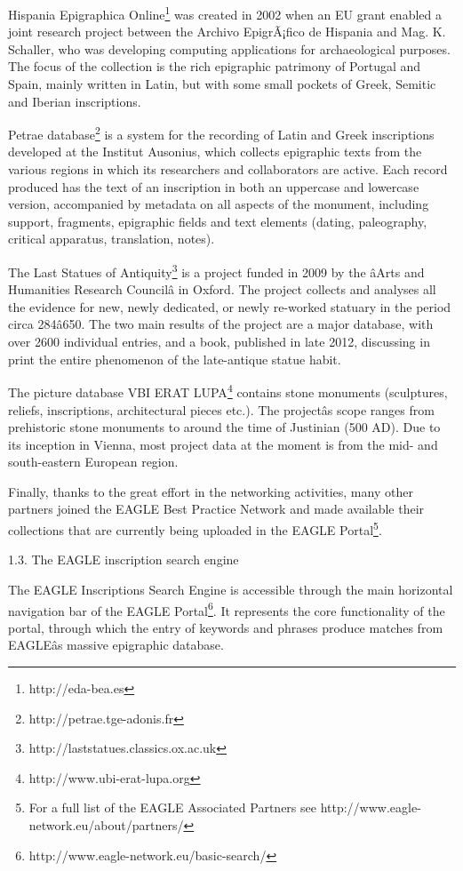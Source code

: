 Hispania Epigraphica Online\footnote{ http://eda-bea.es} was created in 2002 when an EU grant enabled a joint research
project between the Archivo EpigrÃ¡fico de Hispania and Mag. K. Schaller, who was developing computing applications for
archaeological purposes. The focus of the collection is the rich epigraphic patrimony of Portugal and Spain, mainly
written in Latin, but with some small pockets of Greek, Semitic and Iberian inscriptions.

Petrae database\footnote{ http://petrae.tge-adonis.fr} is a system for the recording of Latin and Greek inscriptions
developed at the Institut Ausonius, which collects epigraphic texts from the various regions in which its researchers
and collaborators are active. Each record produced has the text of an inscription in both an uppercase and lowercase
version, accompanied by metadata on all aspects of the monument, including support, fragments, epigraphic fields and
text elements (dating, paleography, critical apparatus, translation, notes).

The Last Statues of Antiquity\footnote{ http://laststatues.classics.ox.ac.uk } is a project funded in 2009 by the âArts
and Humanities Research Councilâ in Oxford. The project collects and analyses all the evidence for new, newly
dedicated, or newly re-worked statuary in the period circa 284â650. The two main results of the project are a major
database, with over 2600 individual entries, and a book, published in late 2012, discussing in print the entire
phenomenon of the late-antique statue habit.

The picture database VBI ERAT LUPA\footnote{ http://www.ubi-erat-lupa.org } contains stone monuments (sculptures,
reliefs, inscriptions, architectural pieces etc.). The projectâs scope ranges from prehistoric stone monuments to
around the time of Justinian (500 AD). Due to its inception in Vienna, most project data at the moment is from the mid-
and south-eastern European region.

Finally, thanks to the great effort in the networking activities, many other partners joined the EAGLE Best Practice
Network and made available their collections that are currently being uploaded in the EAGLE Portal\footnote{ For a full
list of the EAGLE Associated Partners see http://www.eagle-network.eu/about/partners/ }. 

1.3. The EAGLE inscription search engine

The EAGLE Inscriptions Search Engine is accessible through the main horizontal navigation bar of the EAGLE
Portal\footnote{ http://www.eagle-network.eu/basic-search/ }. It represents the core functionality of the portal,
through which the entry of keywords and phrases produce matches from EAGLEâs massive epigraphic database.

